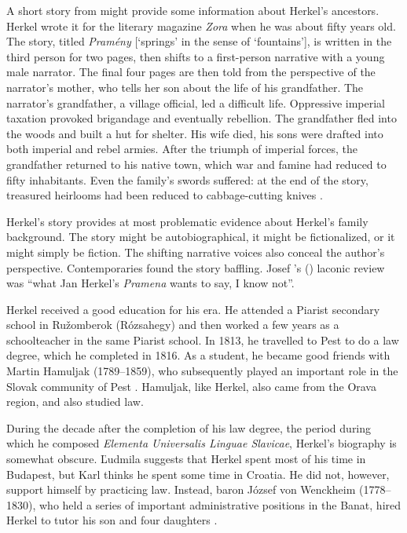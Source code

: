 A short story from \citeyear{herkel_prameny_1836} might provide some information about Herkel’s ancestors. Herkel wrote it for the literary magazine \textit{Zora} when he was about fifty years old. The story, titled \textit{Pramény} [‘springs’ in the sense of ‘fountains’], is written in the third person for two pages, then shifts to a first-person narrative with a young male narrator. The final four pages are then told from the perspective of the narrator’s mother, who tells her son about the life of his grandfather. The narrator’s grandfather, a village official, led a difficult life. Oppressive imperial taxation provoked brigandage and eventually rebellion. The grandfather fled into the woods and built a hut for shelter. His wife died, his sons were drafted into both imperial and rebel armies. After the triumph of imperial forces, the grandfather returned to his native town, which war and famine had reduced to fifty inhabitants. Even the family’s swords suffered: at the end of the story, treasured heirlooms had been reduced to cabbage-cutting knives \citep[209--215]{herkel_prameny_1836}.

Herkel’s story provides at most problematic evidence about Herkel’s family background. The story might be autobiographical, it might be fictionalized, or it might simply be fiction. The shifting narrative voices also conceal the author’s perspective. Contemporaries found the story baffling. Josef \citeauthor{chmelensky_literatura_1836}’s (\citeyear[213]{chmelensky_literatura_1836}) laconic review was “what Jan Herkel’s \textit{Pramena} wants to say, I know not”.

Herkel received a good education for his era. He attended a Piarist secondary school in Ružomberok (Rózsahegy) and then worked a few years as a school\-teacher in the same Piarist school. In 1813, he travelled to Pest to do a law degree, which he completed in 1816. As a student, he became good friends with Martin Hamuljak (1789--1859), who subsequently played an important role in the Slovak community of Pest \citep[3]{herkel_jan_2009}. Hamuljak, like Herkel, also came from the Orava region, and also studied law.

During the decade after the completion of his law degree, the period during which he composed \textit{Elementa Universalis Linguae Slavicae}, Herkel’s biography is somewhat obscure. Ľudmila \citet[3]{herkel_jan_2009} suggests that Herkel spent most of his time in Budapest, but Karl \citet[404]{treimer_johannes_1931} thinks he spent some time in Croatia. He did not, however, support himself by practicing law. Instead, baron József von Wenckheim (1778--1830), who held a series of important administrative positions in the Banat, hired Herkel to tutor his son and four daughters \citep[270]{wurzbach_wenckheim_1886}.

